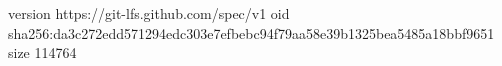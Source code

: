 version https://git-lfs.github.com/spec/v1
oid sha256:da3c272edd571294edc303e7efbebc94f79aa58e39b1325bea5485a18bbf9651
size 114764
